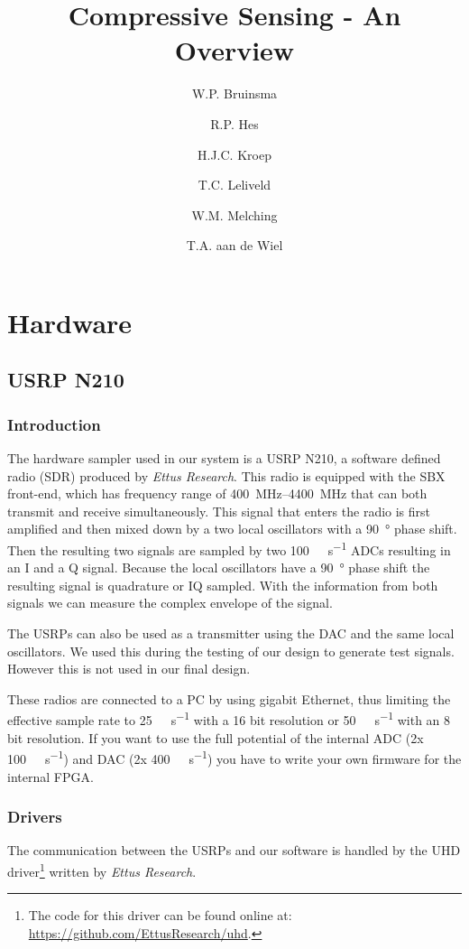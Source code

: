 \documentclass[a4paper, openany, oneside]{memoir}
\title{Compressive Sensing - An Overview}
\author{W.P. Bruinsma \and R.P. Hes \and H.J.C. Kroep \and T.C. Leliveld \and W.M. Melching \and T.A. aan de Wiel}
\begin{document}
\chapter{Hardware}

\section{USRP N210}
\label{sec:usrp-n210}

\subsection{Introduction}
The hardware sampler used in our system is a USRP N210, a software defined radio (SDR) produced by \textit{Ettus Research}. This radio is equipped with the SBX front-end, which has frequency range of \SIrange{400}{4400}{\mega\hertz} that can both transmit and receive simultaneously. This signal that enters the radio is first amplified and then mixed down by a two local oscillators with a \SI{90}{\degree} phase shift. Then the resulting two signals are sampled by two \SI{100}{\mega\sample\per\second} ADCs resulting in an I and a Q signal. Because the local oscillators have a \SI{90}{\degree} phase shift the resulting signal is quadrature or IQ sampled. With the information from both signals we can measure the complex envelope of the signal.

The USRPs can also be used as a transmitter using the DAC and the same local oscillators. We used this during the testing of our design to generate test signals. However this is not used in our final design.

These radios are connected to a PC by using gigabit Ethernet, thus limiting the effective sample rate to \SI{25}{\mega\sample\per\second} with a 16 bit resolution or \SI{50}{\mega\sample\per\second} with an 8 bit resolution. If you want to use the full potential of the internal ADC (2x \SI{100}{\mega\sample\per\second}) and DAC (2x \SI{400}{\mega\sample\per\second}) you have to write your own firmware for the internal FPGA.

\subsection{Drivers}
\label{sec:drivers}
The communication between the USRPs and our software is handled by the UHD driver\footnote{The code for this driver can be found online at: \url{https://github.com/EttusResearch/uhd}.} written by \textit{Ettus Research}.
\end{document}
